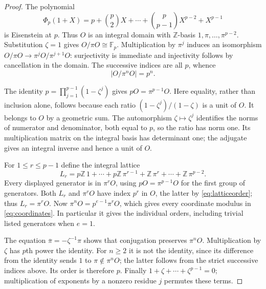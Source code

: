 \begin{proof}
The polynomial
\[
 \Phi_p(1+X)=p+\binom p2X+\cdots+
 \binom p{p-1}X^{p-2}+X^{p-1}
\]
is Eisenstein at $p$. Thus $O$ is an integral domain with
$\mathbb Z$-basis $1,\pi,\ldots,\pi^{p-2}$. Substitution
$\zeta=1$ gives $O/\pi O\cong\mathbb F_p$.
Multiplication by $\pi^j$ induces an isomorphism
$O/\pi O\longrightarrow\pi^jO/\pi^{j+1}O$:
surjectivity is immediate and injectivity follows by cancellation
in the domain. The successive indices are all $p$, whence
\begin{equation}\label{eq:latticeorder}
 |O/\pi^nO|=p^n.
\end{equation}

The identity $p=\prod_{j=1}^{p-1}(1-\zeta^j)$ gives
$pO=\pi^{p-1}O$. Here equality, rather than inclusion alone, follows
because each ratio $(1-\zeta^j)/(1-\zeta)$ is a unit of $O$.
It belongs to $O$ by a geometric sum. The automorphism
$\zeta\mapsto\zeta^j$ identifies the norms of numerator and
denominator, both equal to $p$, so the ratio has norm one.
Its multiplication matrix on the integral basis has determinant one;
the adjugate gives an integral inverse and hence a unit of $O$.

For $1\leq r\leq p-1$ define the integral lattice
\[
 L_r=p\mathbb Z\,1+\cdots+p\mathbb Z\,\pi^{r-1}
       +\mathbb Z\,\pi^r+\cdots+\mathbb Z\,\pi^{p-2}.
\]
Every displayed generator is in $\pi^rO$, using
$pO=\pi^{p-1}O$ for the first group of generators.
Both $L_r$ and $\pi^rO$ have index $p^r$ in $O$, the latter by
\eqref{eq:latticeorder}; thus $L_r=\pi^rO$.
Now $\pi^nO=p^{e-1}\pi^rO$, which gives every coordinate modulus
in \eqref{eq:coordinates}. In particular it gives the individual
orders, including trivial listed generators when $e=1$.

The equation $\overline\pi=-\zeta^{-1}\pi$ shows that conjugation
preserves $\pi^nO$. Multiplication by $\zeta$ has $p$th power the
identity. For $n\geq2$ it is not the identity, since its difference
from the identity sends $1$ to $\pi\notin\pi^nO$; the latter follows
from the strict successive indices above. Its order is therefore $p$.
Finally $1+\zeta+\cdots+\zeta^{p-1}=0$; multiplication of exponents
by a nonzero residue $j$ permutes these terms.
\end{proof}

